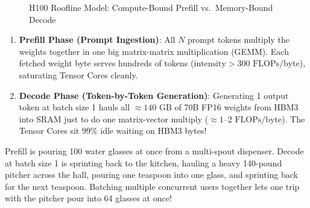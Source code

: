 \begin{figure}[htbp]
\centering
{}
\caption{H100 Roofline Model: Compute-Bound Prefill vs.\ Memory-Bound Decode}
\label{fig:v5-ch09-roofline}
\end{figure}

\begin{enumerate}[leftmargin=18pt]
  \item \textbf{Prefill Phase (Prompt Ingestion)}: All $N$ prompt tokens multiply the weights together in one big matrix-matrix multiplication (GEMM). Each fetched weight byte serves hundreds of tokens ($\text{intensity} > 300\text{ FLOPs/byte}$), saturating Tensor Cores cleanly.
  \item \textbf{Decode Phase (Token-by-Token Generation)}: Generating 1 output token at batch size 1 hauls all $\approx 140\text{ GB}$ of 70B FP16 weights from HBM3 into SRAM just to do one matrix-vector multiply ($\approx 1$--$2\text{ FLOPs/byte}$). The Tensor Cores sit $99\%$ idle waiting on HBM3 bytes!
\end{enumerate}

\begin{intuitionbox}
Prefill is pouring 100 water glasses at once from a multi-spout dispenser. Decode at batch size 1 is sprinting back to the kitchen, hauling a heavy 140-pound pitcher across the hall, pouring one teaspoon into one glass, and sprinting back for the next teaspoon. Batching multiple concurrent users together lets one trip with the pitcher pour into 64 glasses at once!
\end{intuitionbox}

